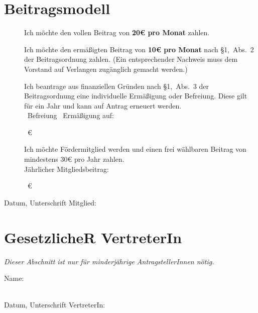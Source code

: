 \documentclass[a4paper,11pt]{scrartcl}
\newcommand{\signskip}{\rule{0pt}{24pt}}
\newcommand{\smallsignskip}{\rule{0pt}{16pt}}
\newcommand{\hinweis}[1]{\emph{#1}}
\begin{document}
\section*{Beitragsmodell}
\begin{description}
  \item[\Square] Ich möchte den vollen Beitrag von \textbf{20€ pro Monat} zahlen.
  \item[\Square] Ich möchte den ermäßigten Beitrag von \textbf{10€ pro Monat}
    nach §1,~Abs.~2 der Beitragsordnung zahlen. (Ein entsprechender Nachweis
    muss dem Vorstand auf Verlangen zugänglich gemacht werden.)
  \item[\Square] Ich beantrage aus finanziellen Gründen nach §1,~Abs.~3 der
    Beitragsordnung eine individuelle Ermäßigung oder Befreiung. Diese gilt für
    ein Jahr und kann auf Antrag erneuert werden. \\
    \Square~Befreiung \hfill
    \Square~Ermäßigung auf: \hrulefill\signskip~€\hfill\phantom{a}
\end{description}

\begin{description}
  \item[\Square] Ich möchte Fördermitglied werden und einen frei wählbaren
    Beitrag von mindestens 30€ pro Jahr zahlen. \\
    Jährlicher Mitgliedsbeitrag: \hrulefill\signskip~€\hfill\phantom{a}
\end{description}
Datum, Unterschrift Mitglied: \hrulefill\smallsignskip

\section*{GesetzlicheR VertreterIn}
\hinweis{Dieser Abschnitt ist nur für minderjährige AntragstellerInnen nötig.}

Name: \hrulefill \signskip \\
Datum, Unterschrift VertreterIn: \hrulefill \signskip
\end{document}
